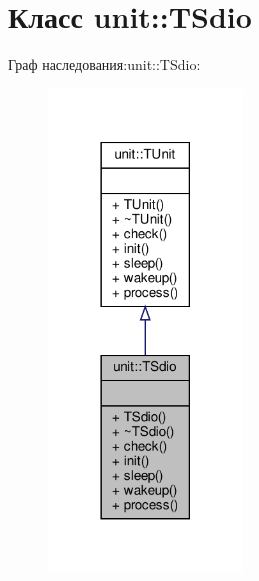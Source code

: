 \hypertarget{classunit_1_1_t_sdio}{}\section{Класс unit\+:\+:T\+Sdio}
\label{classunit_1_1_t_sdio}


Граф наследования\+:unit\+:\+:T\+Sdio\+:\nopagebreak
\begin{figure}[H]
\begin{center}
\leavevmode
\includegraphics[width=146pt]{classunit_1_1_t_sdio__inherit__graph}
\end{center}
\end{figure}


